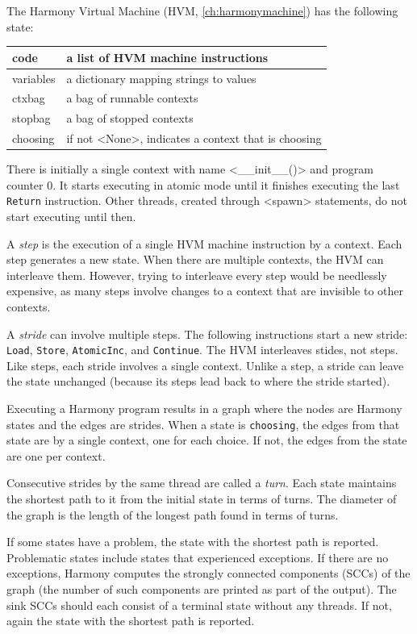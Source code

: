 \documentclass{report}
\begin{document}
The Harmony Virtual Machine (HVM, \autoref{ch:harmonymachine})
has the following state:

\vspace{1em}
\begin{tabular}{|l|l|}
\hline
code & a list of HVM machine instructions \\
\hline
variables & a dictionary mapping strings to values \\
\hline
ctxbag & a bag of runnable contexts \\
\hline
stopbag & a bag of stopped contexts \\
\hline
choosing & if not <{None}>, indicates a context that is choosing \\
\hline
\end{tabular}
\vspace{1em}

There is initially a single context with name
<{__init__()}> and program counter 0.  It starts executing
in atomic mode until it finishes executing the last
\texttt{Return} instruction.
Other threads, created through <{spawn}> statements, do not
start executing until then.

A \emph{step} is the execution of a single HVM machine instruction
by a context.
Each step generates a new state.
When there are multiple contexts, the HVM can interleave them.
However, trying to interleave every step would be needlessly expensive,
as many steps involve changes to a context that are invisible to
other contexts.

A \emph{stride}
%
can involve multiple steps.  The following
instructions start a new stride: \texttt{Load}, \texttt{Store},
\texttt{AtomicInc}, and \texttt{Continue}.  The HVM
interleaves stides, not steps.  Like steps, each
stride involves a single context.  Unlike a step, a stride
can leave the state unchanged (because its steps lead back
to where the stride started).

Executing a Harmony program results in a graph where the nodes are Harmony
states and the edges are strides.
When a state is \texttt{choosing}, the edges from that state are
by a single context, one for each choice.  If not, the edges from
the state are one per context.

Consecutive strides by the same thread are called a \emph{turn}.
Each state maintains the shortest path to it from the initial state in terms
of turns.
The diameter of the graph is the length of the longest path found in
terms of turns.

If some states have a problem, the state with the shortest path is reported.
Problematic states include states that experienced exceptions.
If there are no exceptions, Harmony computes the strongly connected components (SCCs)
of the graph (the number of such components are printed as part of the output).
The sink SCCs should each consist of a terminal state without any threads.
If not, again the state with the shortest path is reported.
\end{document}
